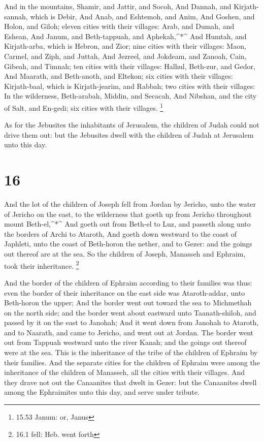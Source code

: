  And in the mountains, Shamir, and Jattir, and Socoh,
 And Dannah, and Kirjath-sannah, which is Debir,
 And Anab, and Eshtemoh, and Anim,  And
Goshen, and Holon, and Giloh; eleven cities with their villages:
 Arab, and Dumah, and Eshean,  And Janum, and
Beth-tappuah, and Aphekah,\^{}*\^{}  And Humtah, and
Kirjath-arba, which is Hebron, and Zior; nine cities with their
villages:  Maon, Carmel, and Ziph, and Juttah,
 And Jezreel, and Jokdeam, and Zanoah,  Cain,
Gibeah, and Timnah; ten cities with their villages: 
Halhul, Beth-zur, and Gedor,  And Maarath, and Beth-anoth,
and Eltekon; six cities with their villages:  Kirjath-baal,
which is Kirjath-jearim, and Rabbah; two cities with their villages:
 In the wilderness, Beth-arabah, Middin, and Secacah,
 And Nibshan, and the city of Salt, and En-gedi; six cities
with their villages. \footnote{15.53 Janum: or, Janus}

 As for the Jebusites the inhabitants of Jerusalem, the
children of Judah could not drive them out: but the Jebusites dwell with
the children of Judah at Jerusalem unto this day.

\hypertarget{section-15}{%
\section{16}\label{section-15}}

 And the lot of the children of Joseph fell from Jordan by
Jericho, unto the water of Jericho on the east, to the wilderness that
goeth up from Jericho throughout mount Beth-el,\^{}*\^{} 
And goeth out from Beth-el to Luz, and passeth along unto the borders of
Archi to Ataroth,  And goeth down westward to the coast of
Japhleti, unto the coast of Beth-horon the nether, and to Gezer: and the
goings out thereof are at the sea.  So the children of
Joseph, Manasseh and Ephraim, took their inheritance. \footnote{16.1
  fell: Heb. went forth}

 And the border of the children of Ephraim according to
their families was thus: even the border of their inheritance on the
east side was Ataroth-addar, unto Beth-horon the upper;  And
the border went out toward the sea to Michmethah on the north side; and
the border went about eastward unto Taanath-shiloh, and passed by it on
the east to Janohah;  And it went down from Janohah to
Ataroth, and to Naarath, and came to Jericho, and went out at Jordan.
 The border went out from Tappuah westward unto the river
Kanah; and the goings out thereof were at the sea. This is the
inheritance of the tribe of the children of Ephraim by their families.
 And the separate cities for the children of Ephraim were
among the inheritance of the children of Manasseh, all the cities with
their villages.  And they drave not out the Canaanites that
dwelt in Gezer: but the Canaanites dwell among the Ephraimites unto this
day, and serve under tribute.

